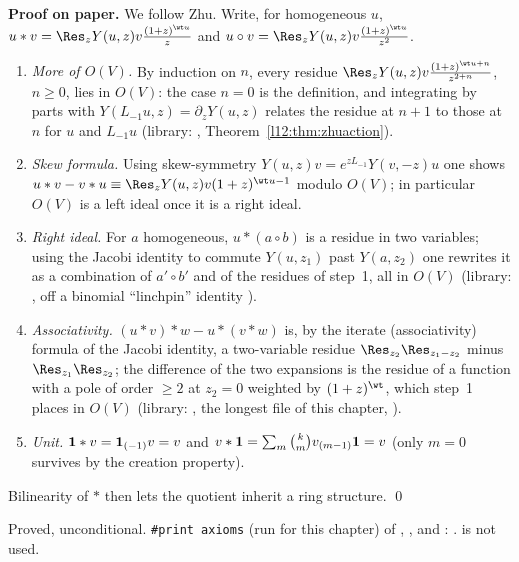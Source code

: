 \textbf{Proof on paper.} We follow Zhu. Write, for homogeneous $u$,
$u*v = \Res_zY(u,z)v\frac{(1+z)^{\wt u}}{z}$ and $u\circ v = \Res_zY(u,z)v\frac{(1+z)^{\wt u}}{z^2}$.
\begin{enumerate}
\item \emph{More of $O(V)$.} By induction on $n$, every residue
  $\Res_zY(u,z)v\frac{(1+z)^{\wt u+n}}{z^{2+n}}$, $n\ge0$, lies in $O(V)$: the case $n=0$ is the definition, and
  integrating by parts with $Y(L_{-1}u,z) = \partial_zY(u,z)$ relates the residue at $n+1$ to those at $n$ for
  $u$ and $L_{-1}u$ (library: , Theorem~\ref{l12:thm:zhuaction}).
\item \emph{Skew formula.} Using skew-symmetry $Y(u,z)v = e^{zL_{-1}}Y(v,-z)u$ one shows
  $u*v - v*u \equiv \Res_zY(u,z)v(1+z)^{\wt u-1}$ modulo $O(V)$; in particular $O(V)$ is a left ideal once it is a
  right ideal.
\item \emph{Right ideal.} For $a$ homogeneous, $u*(a\circ b)$ is a residue in two variables; using the Jacobi
  identity to commute $Y(u,z_1)$ past $Y(a,z_2)$ one rewrites it as a combination of $a'\circ b'$ and of the
  residues of step~1, all in $O(V)$ (library: , off a binomial ``linchpin''
  identity ).
\item \emph{Associativity.} $(u*v)*w - u*(v*w)$ is, by the iterate (associativity) formula of the Jacobi
  identity, a two-variable residue $\Res_{z_2}\Res_{z_1-z_2}$ minus $\Res_{z_1}\Res_{z_2}$; the difference of the
  two expansions is the residue of a function with a pole of order $\ge2$ at $z_2 = 0$ weighted by
  $(1+z)^{\wt}$, which step~1 places in $O(V)$ (library: , the longest file of this
  chapter, ).
\item \emph{Unit.} $\mathbf{1}*v = \mathbf{1}_{(-1)}v = v$ and $v*\mathbf{1} = \sum_m\binom km v_{(m-1)}\mathbf{1} = v$
  (only $m=0$ survives by the creation property).
\end{enumerate}
Bilinearity of $*$ then lets the quotient inherit a ring structure. \qed

\begin{status}
Proved, unconditional. \texttt{\#print axioms} (run for this chapter) of ,
,  and :
.  is not used.
\end{status}

